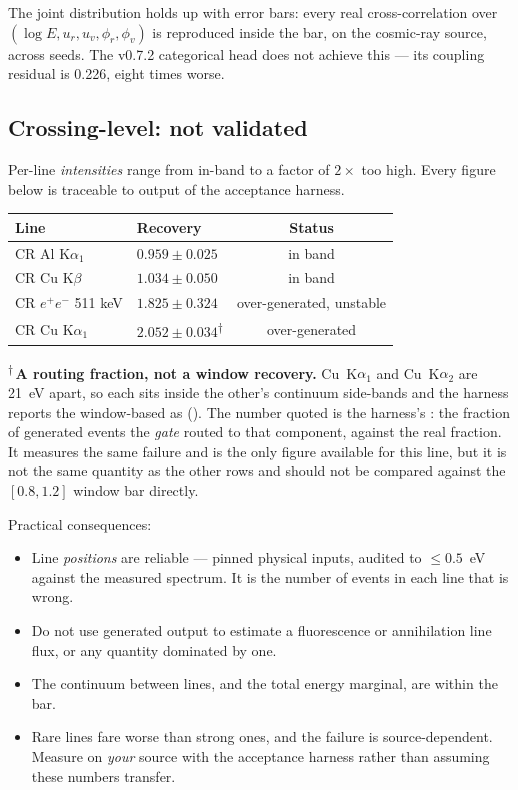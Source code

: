 \documentclass[11pt,a4paper]{article}
\begin{document}
The joint distribution holds up with error bars: every real cross-correlation
over $(\log E, u_r, u_v, \phi_r, \phi_v)$ is reproduced inside the bar, on the
cosmic-ray source, across seeds. The v0.7.2 categorical head does not achieve
this --- its coupling residual is 0.226, eight times worse.

\subsection{Crossing-level: not validated}
\label{sec:crossing-not-validated}

Per-line \emph{intensities} range from in-band to a factor of $2\times$ too
high. Every figure below is traceable to  output of the
acceptance harness.

\begin{center}
\begin{tabular}{@{}llc@{}}
\toprule
\textbf{Line} & \textbf{Recovery} & \textbf{Status} \\
\midrule
CR Al K$\alpha_1$   & $0.959 \pm 0.025$ & in band \\
CR Cu K$\beta$      & $1.034 \pm 0.050$ & in band \\
CR $e^+e^-$ 511 keV & $1.825 \pm 0.324$ & over-generated, unstable \\
CR Cu K$\alpha_1$   & $2.052 \pm 0.034$\textsuperscript{$\dagger$} & over-generated \\
\bottomrule
\end{tabular}
\end{center}

\textsuperscript{$\dagger$}\,\textbf{A routing fraction, not a window
recovery.} Cu~K$\alpha_1$ and Cu~K$\alpha_2$ are 21~eV apart, so each sits
inside the other's continuum side-bands and the harness reports the
window-based  as 
(). The number quoted is the harness's
: the fraction of generated events the \emph{gate} routed to
that component, against the real fraction. It measures the same failure and is
the only figure available for this line, but it is not the same quantity as the
other rows and should not be compared against the $[0.8, 1.2]$ window bar
directly.

Practical consequences:

\begin{itemize}[nosep]
  \item Line \emph{positions} are reliable --- pinned physical inputs, audited
    to $\leq 0.5$~eV against the measured spectrum. It is the number of events
    in each line that is wrong.
  \item Do not use generated output to estimate a fluorescence or annihilation
    line flux, or any quantity dominated by one.
  \item The continuum between lines, and the total energy marginal, are within
    the bar.
  \item Rare lines fare worse than strong ones, and the failure is
    source-dependent. Measure on \emph{your} source with the acceptance
    harness rather than assuming these numbers transfer.
\end{itemize}
\end{document}
